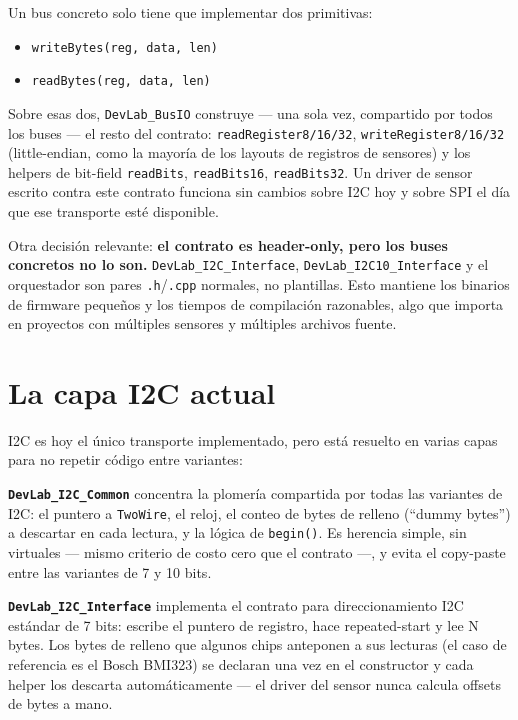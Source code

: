 \documentclass[11pt,a4paper]{article}
\newcommand{\code}[1]{\texttt{\small #1}}
\begin{document}
Un bus concreto solo tiene que implementar dos primitivas:

\begin{itemize}
    \item \code{writeBytes(reg, data, len)}
    \item \code{readBytes(reg, data, len)}
\end{itemize}

Sobre esas dos, \code{DevLab\_BusIO} construye --- una sola vez, compartido por todos los buses --- el resto del contrato: \code{readRegister8/16/32}, \code{writeRegister8/16/32} (little-endian, como la mayoría de los layouts de registros de sensores) y los helpers de bit-field \code{readBits}, \code{readBits16}, \code{readBits32}. Un driver de sensor escrito contra este contrato funciona sin cambios sobre I2C hoy y sobre SPI el día que ese transporte esté disponible.

Otra decisión relevante: \textbf{el contrato es header-only, pero los buses concretos no lo son.} \code{DevLab\_I2C\_Interface}, \code{DevLab\_I2C10\_Interface} y el orquestador son pares \code{.h}/\code{.cpp} normales, no plantillas. Esto mantiene los binarios de firmware pequeños y los tiempos de compilación razonables, algo que importa en proyectos con múltiples sensores y múltiples archivos fuente.

\section*{La capa I2C actual}

I2C es hoy el único transporte implementado, pero está resuelto en varias capas para no repetir código entre variantes:

\textbf{\code{DevLab\_I2C\_Common}} concentra la plomería compartida por todas las variantes de I2C: el puntero a \code{TwoWire}, el reloj, el conteo de bytes de relleno (``dummy bytes'') a descartar en cada lectura, y la lógica de \code{begin()}. Es herencia simple, sin virtuales --- mismo criterio de costo cero que el contrato ---, y evita el copy-paste entre las variantes de 7 y 10 bits.

\textbf{\code{DevLab\_I2C\_Interface}} implementa el contrato para direccionamiento I2C estándar de 7 bits: escribe el puntero de registro, hace repeated-start y lee N bytes. Los bytes de relleno que algunos chips anteponen a sus lecturas (el caso de referencia es el Bosch BMI323) se declaran una vez en el constructor y cada helper los descarta automáticamente --- el driver del sensor nunca calcula offsets de bytes a mano.
\end{document}
